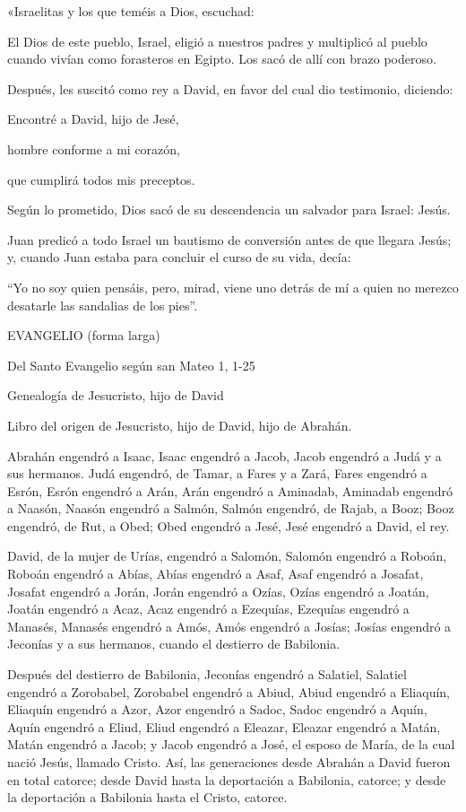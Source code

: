 «Israelitas y los que teméis a Dios, escuchad:

El Dios de este pueblo, Israel, eligió a nuestros padres y multiplicó al
pueblo cuando vivían como forasteros en Egipto. Los sacó de allí con
brazo poderoso.

Después, les suscitó como rey a David, en favor del cual dio testimonio,
diciendo:

Encontré a David, hijo de Jesé,

hombre conforme a mi corazón,

que cumplirá todos mis preceptos.

Según lo prometido, Dios sacó de su descendencia un salvador para
Israel: Jesús.

Juan predicó a todo Israel un bautismo de conversión antes de que
llegara Jesús; y, cuando Juan estaba para concluir el curso de su vida,
decía:

``Yo no soy quien pensáis, pero, mirad, viene uno detrás de mí a quien
no merezco desatarle las sandalias de los pies''.

EVANGELIO (forma larga)

Del Santo Evangelio según san Mateo 1, 1-25

Genealogía de Jesucristo, hijo de David

Libro del origen de Jesucristo, hijo de David, hijo de Abrahán.

Abrahán engendró a Isaac, Isaac engendró a Jacob, Jacob engendró a Judá
y a sus hermanos. Judá engendró, de Tamar, a Fares y a Zará, Fares
engendró a Esrón, Esrón engendró a Arán, Arán engendró a Aminadab,
Aminadab engendró a Naasón, Naasón engendró a Salmón, Salmón engendró,
de Rajab, a Booz; Booz engendró, de Rut, a Obed; Obed engendró a Jesé,
Jesé engendró a David, el rey.

David, de la mujer de Urías, engendró a Salomón, Salomón engendró a
Roboán, Roboán engendró a Abías, Abías engendró a Asaf, Asaf engendró a
Josafat, Josafat engendró a Jorán, Jorán engendró a Ozías, Ozías
engendró a Joatán, Joatán engendró a Acaz, Acaz engendró a Ezequías,
Ezequías engendró a Manasés, Manasés engendró a Amós, Amós engendró a
Josías; Josías engendró a Jeconías y a sus hermanos, cuando el destierro
de Babilonia.

Después del destierro de Babilonia, Jeconías engendró a Salatiel,
Salatiel engendró a Zorobabel, Zorobabel engendró a Abiud, Abiud
engendró a Eliaquín, Eliaquín engendró a Azor, Azor engendró a Sadoc,
Sadoc engendró a Aquín, Aquín engendró a Eliud, Eliud engendró a
Eleazar, Eleazar engendró a Matán, Matán engendró a Jacob; y Jacob
engendró a José, el esposo de María, de la cual nació Jesús, llamado
Cristo. Así, las generaciones desde Abrahán a David fueron en total
catorce; desde David hasta la deportación a Babilonia, catorce; y desde
la deportación a Babilonia hasta el Cristo, catorce.

